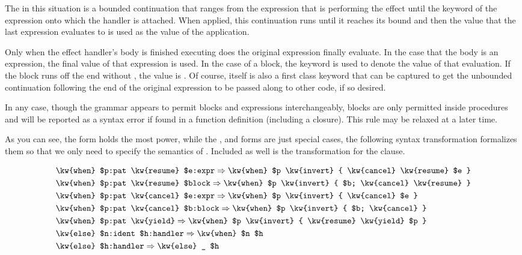 The  in this situation is a bounded continuation that ranges from the
 expression that is performing the effect until the  keyword
of the expression onto which the handler is attached. When applied, this continuation
runs until it reaches its bound and then the value that the last expression evaluates
to is used as the value of the  application.

Only when the effect handler's body is finished executing does the original
expression finally evaluate. In the case that the body is an expression, the
final value of that expression is used. In the case of a block, the 
keyword is used to denote the value of that evaluation. If the block runs off
the end without , the value is . Of course,  itself
is also a first class keyword that can be captured to get the unbounded continuation
following the end of the original expression to be passed along to other code, if
so desired.

In any case, though the grammar appears to permit blocks and expressions interchangeably,
blocks are only permitted inside procedures and will be reported as a syntax error if found
in a function definition (including a  closure). This rule may be relaxed at a later
time.

As you can see, the  form holds the most power, while the , 
and  forms are just special cases, the following syntax transformation
formalizes them so that we only need to specify the semantics of .
Included as well is the transformation for the  clause.

\begin{align*}
    & \texttt{\kw{when} \$p:pat \kw{resume} \$e:expr} \Rightarrow \texttt{\kw{when} \$p \kw{invert} \{ \kw{cancel} \kw{resume} \$e \}} \\ %
    & \texttt{\kw{when} \$p:pat \kw{resume} \$block} \Rightarrow \texttt{\kw{when} \$p \kw{invert} \{ \$b; \kw{cancel} \kw{resume} \}} \\ %
    & \texttt{\kw{when} \$p:pat \kw{cancel} \$e:expr} \Rightarrow \texttt{\kw{when} \$p \kw{invert} \{ \kw{cancel} \$e \}} \\ %
    & \texttt{\kw{when} \$p:pat \kw{cancel} \$b:block} \Rightarrow \texttt{\kw{when} \$p \kw{invert} \{ \$b; \kw{cancel} \}} \\ %
    & \texttt{\kw{when} \$p:pat \kw{yield}} \Rightarrow \texttt{\kw{when} \$p \kw{invert} \{ \kw{resume} \kw{yield} \$p \}} \\ %
    & \texttt{\kw{else} \$n:ident \$h:handler} \Rightarrow \texttt{\kw{when} \$n \$h} \\ %
    & \texttt{\kw{else} \$h:handler} \Rightarrow \texttt{\kw{else} \_ \$h} \\ %
\end{align*}

